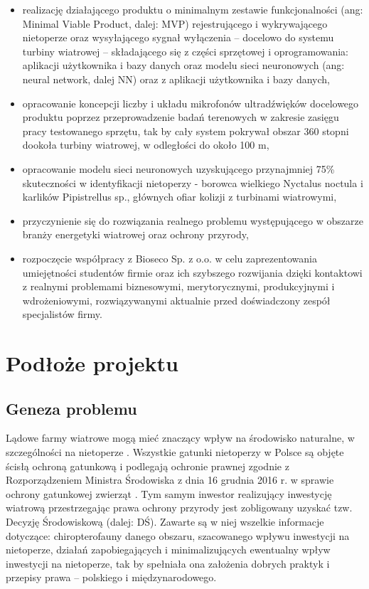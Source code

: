\documentclass{sprz}
\begin{document}
\begin{itemize}
  \item{realizację działającego produktu o minimalnym zestawie funkcjonalności (ang: Minimal Viable Product, dalej: MVP) rejestrującego i wykrywającego nietoperze oraz wysyłającego sygnał wyłączenia – docelowo do systemu turbiny wiatrowej – składającego się z części sprzętowej i oprogramowania: aplikacji użytkownika i bazy danych oraz modelu sieci neuronowych (ang: neural network, dalej NN) oraz z aplikacji użytkownika i bazy danych,}
  \item{opracowanie koncepcji liczby i układu mikrofonów ultradźwięków docelowego produktu poprzez przeprowadzenie badań terenowych w zakresie zasięgu pracy testowanego sprzętu, tak by cały system pokrywał obszar 360 stopni dookoła turbiny wiatrowej, w odległości do około 100 m,}
  \item{opracowanie modelu sieci neuronowych uzyskującego przynajmniej 75\% skuteczności w identyfikacji nietoperzy - borowca wielkiego Nyctalus noctula i karlików Pipistrellus sp., głównych ofiar kolizji z turbinami wiatrowymi,}
  \item{przyczynienie się do rozwiązania realnego problemu występującego w obszarze branży energetyki wiatrowej oraz ochrony przyrody,}
  \item{rozpoczęcie współpracy z Bioseco Sp. z o.o. w celu zaprezentowania umiejętności studentów firmie oraz ich szybszego rozwijania dzięki kontaktowi z realnymi problemami biznesowymi, merytorycznymi, produkcyjnymi i wdrożeniowymi, rozwiązywanymi aktualnie przed doświadczony zespół specjalistów firmy.}
  \end{itemize}
  

\chapter{Podłoże projektu}

\section{Geneza problemu}

Lądowe farmy wiatrowe mogą mieć znaczący wpływ na środowisko naturalne, w szczególności na nietoperze \cite{Wytyczne}. Wszystkie gatunki nietoperzy w Polsce są objęte ścisłą ochroną gatunkową i podlegają ochronie prawnej zgodnie z Rozporządzeniem Ministra Środowiska z dnia 16 grudnia 2016 r. w sprawie ochrony gatunkowej zwierząt \cite{Rozporządzenie}. Tym samym inwestor realizujący inwestycję wiatrową przestrzegając prawa ochrony przyrody jest zobligowany uzyskać tzw. Decyzję Środowiskową (dalej: DŚ). Zawarte są w niej wszelkie informacje dotyczące: chiropterofauny danego obszaru, szacowanego wpływu inwestycji na nietoperze, działań zapobiegających i minimalizujących ewentualny wpływ inwestycji na nietoperze, tak by spełniała ona założenia dobrych praktyk i przepisy prawa – polskiego 
i międzynarodowego. 
\end{document}
